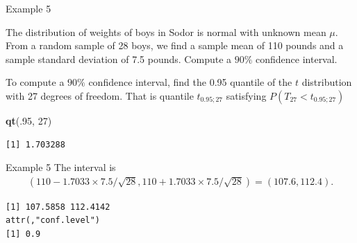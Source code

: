 \documentclass[
  ignorenonframetext,
]{beamer}
\newenvironment{Shaded}{\begin{snugshade}}{\end{snugshade}}
\newcommand{\AttributeTok}[1]{\textcolor[rgb]{0.13,0.29,0.53}{#1}}
\newcommand{\CommentTok}[1]{\textcolor[rgb]{0.56,0.35,0.01}{\textit{#1}}}
\newcommand{\DecValTok}[1]{\textcolor[rgb]{0.00,0.00,0.81}{#1}}
\newcommand{\FloatTok}[1]{\textcolor[rgb]{0.00,0.00,0.81}{#1}}
\newcommand{\FunctionTok}[1]{\textcolor[rgb]{0.13,0.29,0.53}{\textbf{#1}}}
\newcommand{\NormalTok}[1]{#1}
\newcommand{\SpecialCharTok}[1]{\textcolor[rgb]{0.81,0.36,0.00}{\textbf{#1}}}
\begin{document}
\begin{frame}[fragile]{Example 5}
\protect\hypertarget{example-5}{}
\begin{tcolorbox}
The distribution of weights of boys in Sodor is normal with unknown mean $\mu$. From a random sample of 28 boys, we find a sample mean of 110 pounds and a sample standard deviation of 7.5 pounds. Compute a $90\%$ confidence interval. 
\end{tcolorbox}

To compute a \(90\%\) confidence interval, find the 0.95 quantile of the
\(t\) distribution with 27 degrees of freedom. That is quantile
\(t_{0.95;27}\) satisfying \(P(T_{27}<t_{0.95;27})\)

\tiny

\begin{Shaded}
\begin{Highlighting}[]
\FunctionTok{qt}\NormalTok{(.}\DecValTok{95}\NormalTok{, }\DecValTok{27}\NormalTok{)}
\end{Highlighting}
\end{Shaded}

\begin{verbatim}
[1] 1.703288
\end{verbatim}

\normalsize
\end{frame}

\begin{frame}[fragile]{Example 5}
\protect\hypertarget{example-5-1}{}
The interval is \[\begin{array}{ll}
(110-1.7033\times 7.5/\sqrt{28},110+1.7033\times 7.5/\sqrt{28})=(107.6, 112.4).
\end{array}\]

\tiny

\begin{Shaded}
\end{Shaded}

\begin{verbatim}
[1] 107.5858 112.4142
attr(,"conf.level")
[1] 0.9
\end{verbatim}

\normalsize
\end{frame}
\end{document}
